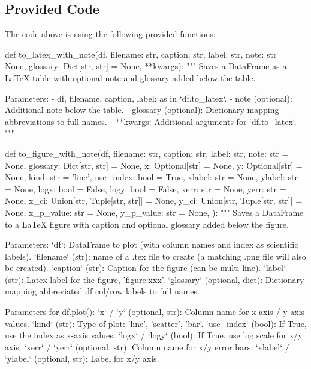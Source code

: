 \documentclass[11pt]{article}
\begin{document}
\subsection{Provided Code}
The code above is using the following provided functions:

\begin{python}
def to_latex_with_note(df, filename: str, caption: str, label: str,
                       note: str = None, glossary: Dict[str, str] = None, **kwargs):
    """
    Saves a DataFrame as a LaTeX table with optional note and glossary added below the table.

    Parameters:
    - df, filename, caption, label: as in `df.to_latex`.
    - note (optional): Additional note below the table.
    - glossary (optional): Dictionary mapping abbreviations to full names.
    - **kwargs: Additional arguments for `df.to_latex`.
    """

def to_figure_with_note(df, filename: str, caption: str, label: str,
                        note: str = None, glossary: Dict[str, str] = None, 
                        x: Optional[str] = None, y: Optional[str] = None, kind: str = 'line',
                        use_index: bool = True, 
                        xlabel: str = None, ylabel: str = None,
                        logx: bool = False, logy: bool = False,
                        xerr: str = None, yerr: str = None,
                        x_ci: Union[str, Tuple[str, str]] = None, y_ci: Union[str, Tuple[str, str]] = None,
                        x_p_value: str = None, y_p_value: str = None,
                        ):
    """
    Saves a DataFrame to a LaTeX figure with caption and optional glossary added below the figure.

    Parameters:
    `df`: DataFrame to plot (with column names and index as scientific labels). 
    `filename` (str): name of a .tex file to create (a matching .png file will also be created). 
    `caption` (str): Caption for the figure (can be multi-line).
    `label` (str): Latex label for the figure, 'figure:xxx'. 
    `glossary` (optional, dict): Dictionary mapping abbreviated df col/row labels to full names.

    Parameters for df.plot():
    `x` / `y` (optional, str): Column name for x-axis / y-axis values.
    `kind` (str): Type of plot: 'line', 'scatter', 'bar'.
    `use_index` (bool): If True, use the index as x-axis values.
    `logx` / `logy` (bool): If True, use log scale for x/y axis.
    `xerr` / `yerr` (optional, str): Column name for x/y error bars.
    `xlabel` / `ylabel` (optional, str): Label for x/y axis.


\end{python}
\end{document}
